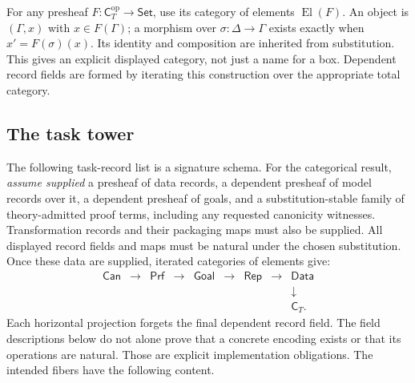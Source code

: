 \documentclass[11pt]{article}
\newcommand{\Cat}[1]{\mathsf{#1}}
\newcommand{\El}{\operatorname{El}}
\begin{document}
For any presheaf $F:\Cat C_T^{\mathrm{op}}\to\Cat{Set}$, use its
category of elements $\El(F)$. An object is $(\Gamma,x)$ with
$x\in F(\Gamma)$; a morphism over $\sigma:\Delta\to\Gamma$ exists
exactly when $x'=F(\sigma)(x)$. Its identity and composition are inherited
from substitution. This gives an explicit displayed category, not just a
name for a box. Dependent record fields are formed by iterating this
construction over the appropriate total category.

\subsection{The task tower}

The following task-record list is a signature schema. For the categorical
result, \emph{assume supplied} a presheaf of data records, a dependent
presheaf of model records over it, a dependent presheaf of goals, and a
substitution-stable family of theory-admitted proof terms, including
any requested canonicity witnesses. Transformation records and their
packaging maps must also be supplied. All displayed
record fields and maps must be natural under the chosen substitution.
Once these data are supplied, iterated categories of elements give:
\[
\begin{array}{ccccccccc}
 \Cat{Can} &\longrightarrow& \Cat{Prf} &\longrightarrow&
 \Cat{Goal} &\longrightarrow& \Cat{Rep} &\longrightarrow& \Cat{Data}\\
 &&&&&&&&\downarrow\\[-2pt]
 &&&&&&&&\Cat C_T .
\end{array}                                                     \tag{D1}
\]
Each horizontal projection forgets the final dependent record field.
The field descriptions below do not alone prove that a concrete encoding
exists or that its operations are natural. Those are explicit implementation
obligations. The intended fibers have the following content.
\end{document}
